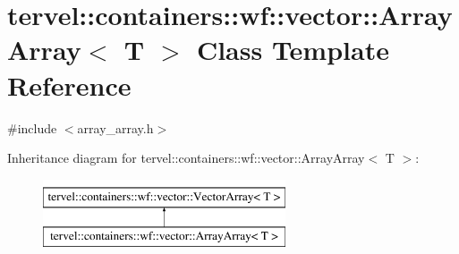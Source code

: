 \hypertarget{classtervel_1_1containers_1_1wf_1_1vector_1_1_array_array}{}\section{tervel\+:\+:containers\+:\+:wf\+:\+:vector\+:\+:Array\+Array$<$ T $>$ Class Template Reference}
\label{classtervel_1_1containers_1_1wf_1_1vector_1_1_array_array}


{\ttfamily \#include $<$array\+\_\+array.\+h$>$}

Inheritance diagram for tervel\+:\+:containers\+:\+:wf\+:\+:vector\+:\+:Array\+Array$<$ T $>$\+:\begin{figure}[H]
\begin{center}
\leavevmode
\includegraphics[height=2.000000cm]{classtervel_1_1containers_1_1wf_1_1vector_1_1_array_array}
\end{center}
\end{figure}
